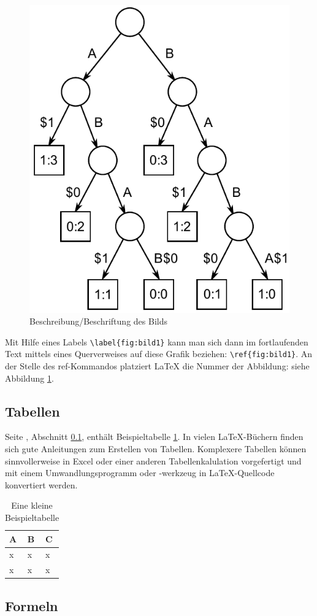 \begin{figure}[ht]
\centering
\includegraphics[width=.4\textwidth]{images/Suffix_tree_ABAB_BABA}
\caption{\label{fig:bild1}Beschreibung/Beschriftung des Bilds}
\end{figure}

Mit Hilfe eines Labels \verb|\label{fig:bild1}| kann man sich dann im fortlaufenden Text mittels eines Querverweises auf diese Grafik beziehen: \verb|\ref{fig:bild1}|. An der Stelle des ref-Kommandos platziert LaTeX die Nummer der Abbildung: \glq siehe Abbildung \ref{fig:bild1}\grq.


\subsection{Tabellen}
\label{sec:tabellen}

Seite \pageref{tab:beispieltabelle}, Abschnitt \ref{sec:tabellen}, enthält Beispieltabelle \ref{tab:beispieltabelle}. In vielen \LaTeX{}-Büchern finden sich gute Anleitungen zum Erstellen von Tabellen. Komplexere Tabellen können sinnvollerweise in Excel oder einer anderen Tabellenkalulation vorgefertigt und mit einem Umwandlungsprogramm oder -werkzeug in LaTeX-Quellcode konvertiert werden.

\begin{table}[h]
\begin{center}
\begin{tabular}{|lll|}
    \hline
	A & B & C \\
	\hline
	x & x & x \\
	x & x & x \\
	\hline
\end{tabular}
\end{center}
\caption{Eine kleine Beispieltabelle}
\label{tab:beispieltabelle}
\end{table}


\subsection{Formeln}

